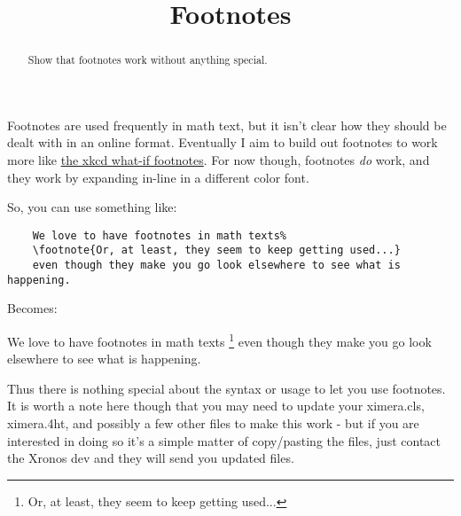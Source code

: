 \documentclass{ximera}
\title{Footnotes}
\begin{document}
\begin{abstract}
    Show that footnotes work without anything special.
\end{abstract}
\maketitle

Footnotes are used frequently in math text, but it isn't clear how they should be dealt with in an online format. Eventually I aim to build out footnotes to work more like \href{https://what-if.xkcd.com/}{the xkcd what-if footnotes}. For now though, footnotes \textit{do} work, and they work by expanding in-line in a different color font.

So, you can use something like:

\begin{verbatim}
    We love to have footnotes in math texts%
    \footnote{Or, at least, they seem to keep getting used...}
    even though they make you go look elsewhere to see what is happening.
\end{verbatim}

Becomes:

We love to have footnotes in math texts%
\footnote{Or, at least, they seem to keep getting used...}
even though they make you go look elsewhere to see what is happening.

Thus there is nothing special about the syntax or usage to let you use footnotes. It is worth a note here though that you may need to update your ximera.cls, ximera.4ht, and possibly a few other files to make this work - but if you are interested in doing so it's a simple matter of copy/pasting the files, just contact the Xronos dev and they will send you updated files.
\end{document}
